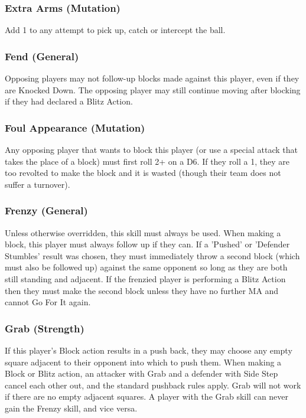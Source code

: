 \begin{multicols}{3}
\subsubsection{Extra Arms (Mutation)}
\par Add 1 to any attempt to pick up, catch or intercept the ball.

\subsubsection{Fend (General)}
\par Opposing players may not follow-up blocks made against this player, even if they are Knocked Down. The opposing player may still continue moving after blocking if they had declared a Blitz Action.

\subsubsection{Foul Appearance (Mutation)}
\par Any opposing player that wants to block this player (or use a special attack that takes the place of a block) must first roll 2+ on a D6. If they roll a 1, they are too revolted to make the block and it is wasted (though their team does not suffer a turnover).

\subsubsection{Frenzy (General)}
\par Unless otherwise overridden, this skill must always be used. When making a block, this player must always follow up if they can. If a 'Pushed' or 'Defender Stumbles' result was chosen, they must immediately throw a second block (which must also be followed up) against the same opponent so long as they are both still standing and adjacent. If the frenzied player is performing a Blitz Action then they must make the second block unless they have no further MA and cannot Go For It again.

\subsubsection{Grab (Strength)}
\par If this player's Block action results in a push back, they may choose any empty square adjacent to their opponent into which to push them. When making a Block or Blitz action, an attacker with Grab and a defender with Side Step cancel each other out, and the standard pushback rules apply. Grab will not work if there are no empty adjacent squares. A player with the Grab skill can never gain the Frenzy skill, and vice versa.


\end{multicols}
